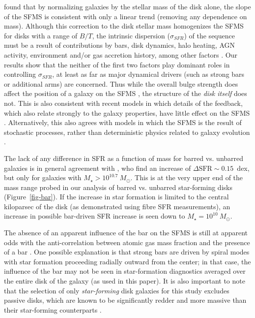 \documentclass[useAMS,usenatbib]{mn2e}
\def\rr{\color{titlecol}}
\begin{document}
\citet{abr14} found that by normalizing galaxies by the stellar mass of the disk alone, the slope of the SFMS is consistent with only a linear trend (removing any dependence on mass). Although this correction to the disk stellar mass homogenizes the SFMS for disks with a range of $B/T$, the intrinsic dispersion ($\sigma_{SFR}$) of the sequence must be a result of contributions by bars, disk dynamics, halo heating, AGN activity, {\rr environment and/or gas accretion history, among other factors \citep{dut10}. Our results show that the neither of the first two factors play dominant roles in controlling $\sigma_{SFR}$, at least as far as major dynamical drivers (such as strong bars or additional arms) are concerned. Thus while the overall bulge strength does affect the position of a galaxy on the SFMS \citep{mar09,che12a,fan13,kav14,lan14,oma14}, the structure of the \emph{disk itself} does not. This is also consistent with recent models in which details of the feedback, which also relate strongly to the galaxy properties, have little effect on the SFMS \citep{hop14}. Alternatively, this also agrees with models in which the SFMS is the result of stochastic processes, rather than deterministic physics related to galaxy evolution \citep{kel14b}. }

The lack of any difference in SFR as a function of mass for barred vs. unbarred galaxies is in general agreement with \citet{ell11}, who find an increase of $\Delta\textrm{SFR}\sim0.15$~dex, but only for galaxies with $M_\star>10^{10.7}~M_\odot$. This is at the very upper end of the mass range probed in our analysis of barred vs. unbarred star-forming disks (Figure~\ref{fig-bar}). If the increase in star formation is limited to the central kiloparsec of the disk (as demonstrated using fibre SFR measurements), an increase in possible bar-driven SFR increase is seen down to $M_\star=10^{10}~M_\odot$. 

The absence of an apparent influence of the bar on the SFMS is still at apparent odds with the anti-correlation between atomic gas mass fraction and the presence of a bar \citep{mas12a}. One possible explanation is that strong bars are driven by spiral modes with star formation proceeding radially outward from the center; in that case, the influence of the bar may not be seen in star-formation diagnostics averaged over the entire disk of the galaxy (as used in this paper). It is also important to note that the selection of only \emph{star-forming} disk galaxies for this study excludes passive disks, which are known to be significantly redder and more massive than their star-forming counterparts \citep{mas10a,cor12}. 
\end{document}
